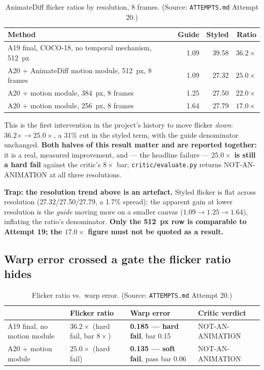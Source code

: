 \documentclass[11pt]{article}
\begin{document}
\begin{table}[h]
\centering
\caption{AnimateDiff flicker ratios by resolution, 8 frames.
(Source: \texttt{ATTEMPTS.md} Attempt 20.)}
\label{tab:animatediffflicker}
\begin{tabular}{@{}L{6.5cm}rrr@{}}
\toprule
Method & Guide & Styled & Ratio \\
\midrule
A19 final, COCO-18, no temporal mechanism, 512~px & 1.09 & 39.58 & $\mathbf{36.2\times}$ \\
A20 + AnimateDiff motion module, 512~px, 8 frames & 1.09 & 27.32 & $\mathbf{25.0\times}$ \\
A20 + motion module, 384~px, 8 frames & 1.25 & 27.50 & $22.0\times$ \\
A20 + motion module, 256~px, 8 frames & 1.64 & 27.79 & $17.0\times$ \\
\bottomrule
\end{tabular}
\end{table}

This is the first intervention in the project's history to move flicker
\emph{down}: $36.2\times \rightarrow 25.0\times$, a 31\% cut in the
styled term, with the guide denominator unchanged. \textbf{Both halves of
this result matter and are reported together:} it is a real, measured
improvement, and --- the headline failure --- $\mathbf{25.0\times}$
\textbf{is still a hard fail} against the critic's $8\times$ bar;
\texttt{critic/evaluate.py} returns NOT-AN-ANIMATION at all three
resolutions.

\textbf{Trap: the resolution trend above is an artefact.} Styled flicker
is flat across resolution (27.32/27.50/27.79, a 1.7\% spread); the
apparent gain at lower resolution is the \emph{guide} moving more on a
smaller canvas ($1.09 \rightarrow 1.25 \rightarrow 1.64$), inflating the
ratio's denominator. \textbf{Only the 512~px row is comparable to Attempt
19; the $17.0\times$ figure must not be quoted as a result.}

\subsection{Warp error crossed a gate the flicker ratio hides}
\label{sec:warperror}

\begin{table}[h]
\centering
\caption{Flicker ratio vs.\ warp error. (Source: \texttt{ATTEMPTS.md} Attempt 20.)}
\label{tab:warpvsflicker}
\begin{tabular}{@{}L{4.3cm}L{3.5cm}L{4cm}l@{}}
\toprule
 & Flicker ratio & Warp error & Critic verdict \\
\midrule
A19 final, no motion module & $36.2\times$ (hard fail, bar $8\times$) & \textbf{0.185 --- hard fail}, bar 0.15 & NOT-AN-ANIMATION \\
A20 + motion module & $25.0\times$ (hard fail) & \textbf{0.135 --- soft fail}, pass bar 0.06 & NOT-AN-ANIMATION \\
\bottomrule
\end{tabular}
\end{table}
\end{document}
